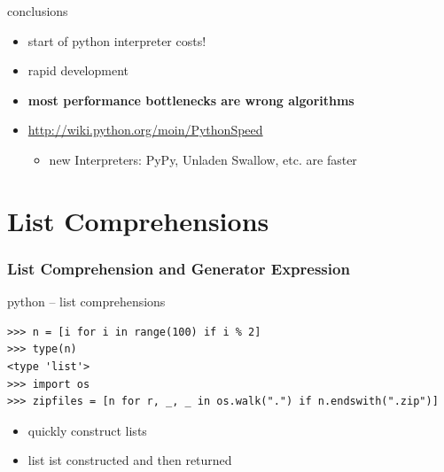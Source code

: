 \documentclass{beamer}
\begin{document}
\begin{frame}
    \begin{alertblock}{conclusions}
    \begin{itemize}
        \item start of python interpreter costs! %
        	\item rapid development %
        \item \textbf{most performance bottlenecks are wrong algorithms}
        \item \url{http://wiki.python.org/moin/PythonSpeed}
        \begin{itemize}
        	\item new Interpreters: PyPy, Unladen Swallow, etc. are faster
        \end{itemize}
    \end{itemize}
    \end{alertblock}
\end{frame}

\section{List Comprehensions}	%

\begin{frame}[fragile]
	\frametitle{List Comprehension and Generator Expression}
	\begin{exampleblock}{python -- list comprehensions}
	\begin{lstlisting}
>>> n = [i for i in range(100) if i % 2]
>>> type(n)
<type 'list'>
>>> import os
>>> zipfiles = [n for r, _, _ in os.walk(".") if n.endswith(".zip")]
	\end{lstlisting}
	\end{exampleblock}
	
	\begin{itemize}
		\item quickly construct lists
		\item list ist constructed and then returned
	\end{itemize}

\end{frame}
\end{document}
